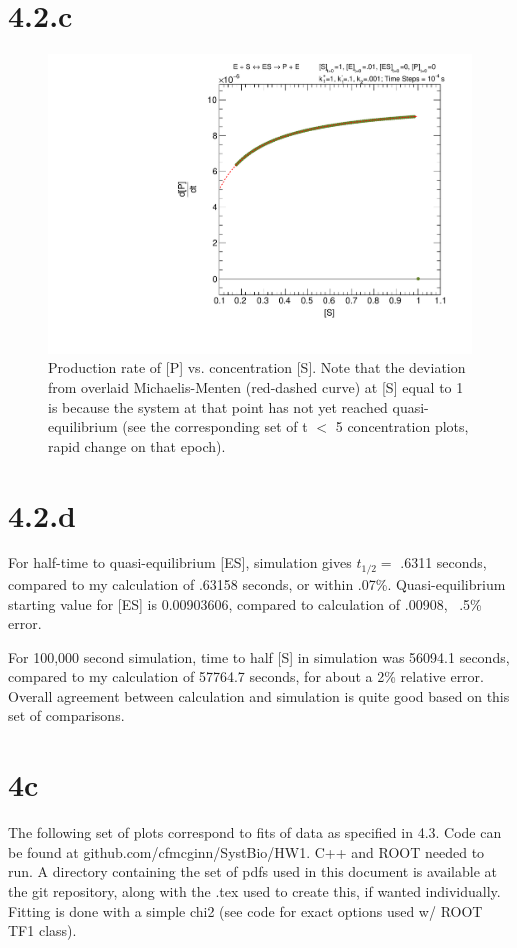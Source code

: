 \documentclass{article}
\begin{document}
\section{4.2.c}

\begin{figure}[H]
    \centering
    \includegraphics[width=.49\textwidth]{canv100k_PRate_c.pdf} 
    \caption{Production rate of [P] vs. concentration [S]. Note that the deviation from overlaid Michaelis-Menten (red-dashed curve) at [S] equal to 1 is because the system at that point has not yet reached quasi-equilibrium (see the corresponding set of t $<$ 5 concentration plots, rapid change on that epoch).}
    \label{}
\end{figure}

\section{4.2.d}
For half-time to quasi-equilibrium [ES], simulation gives $t_{1/2} = $ .6311 seconds, compared to my calculation of .63158 seconds, or within .07\%. Quasi-equilibrium starting value for [ES] is 0.00903606, compared to calculation of .00908, ~.5\% error.

For 100,000 second simulation, time to half [S] in simulation was 56094.1 seconds, compared to my calculation of 57764.7 seconds, for about a 2\% relative error. Overall agreement between calculation and simulation is quite good based on this set of comparisons.


\section{4c}
The following set of plots correspond to fits of data as specified in 4.3. Code can be found at github.com/cfmcginn/SystBio/HW1. C++ and ROOT needed to run. A directory containing the set of pdfs used in this document is available at the git repository, along with the .tex used to create this, if wanted individually. Fitting is done with a simple chi2 (see code for exact options used w/ ROOT TF1 class). 
\end{document}
